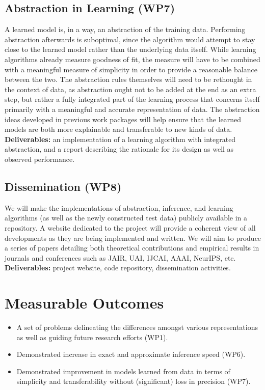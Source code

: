 \documentclass{article}
\begin{document}
\subsection{Abstraction in Learning (WP7)}

A learned model is, in a way, an abstraction of the training data. Performing
abstraction afterwards is suboptimal, since the algorithm would attempt to
stay close to the learned model rather than the underlying data itself. While
learning algorithms already measure goodness of fit, the measure will have to be
combined with a meaningful measure of simplicity in order to provide a
reasonable balance between the two. The abstraction rules themselves will need
to be rethought in the context of data, as abstraction ought not to be added at
the end as an extra step, but rather a fully integrated part of the learning
process that concerns itself primarily with a meaningful and accurate
representation of data. The abstraction ideas developed in previous work
packages will help ensure that the learned models are both more explainable and
transferable to new kinds of data. \textbf{Deliverables:} an implementation of a
learning algorithm with integrated abstraction, and a report describing the
rationale for its design as well as observed performance.

\subsection{Dissemination (WP8)}

We will make the implementations of abstraction, inference, and learning
algorithms (as well as the newly constructed test data) publicly available in a
repository. A website dedicated to the project will provide a coherent view of
all developments as they are being implemented and written. We will aim to
produce a series of papers detailing both theoretical contributions and
empirical results in journals and conferences such as JAIR, UAI, IJCAI, AAAI,
NeurIPS, etc. \textbf{Deliverables:} project website, code repository,
dissemination activities.

\section{Measurable Outcomes}

\begin{itemize}
\item A set of problems delineating the differences amongst various
  representations as well as guiding future research efforts (WP1).
\item Demonstrated increase in exact and approximate inference speed (WP6).
\item Demonstrated improvement in models learned from data in terms of
  simplicity and transferability without (significant) loss in precision (WP7).
\end{itemize}
\end{document}
